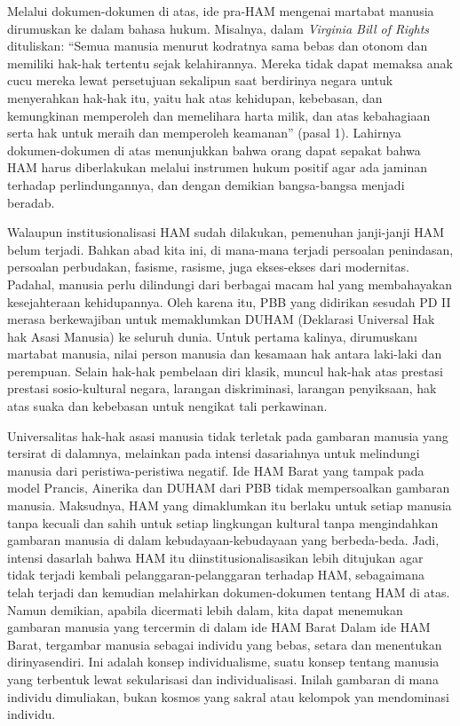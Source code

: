\documentclass[10pt,a4paper]{article}
\begin{document}
\begin{multicols}{2}
Melalui dokumen-dokumen di atas, ide pra-HAM mengenai martabat manusia
dirumuskan ke dalam bahasa hukum. Misalnya, dalam \emph{Virginia Bill of
Rights} dituliskan: ``Semua manusia menurut kodratnya sama bebas dan
otonom dan memiliki hak-hak tertentu sejak kelahirannya. Mereka tidak
dapat memaksa anak cucu mereka lewat persetujuan sekalipun saat
berdirinya negara untuk menyerahkan hak-hak itu, yaitu hak atas
kehidupan, kebebasan, dan kemungkinan memperoleh dan memelihara harta
milik, dan atas kebahagiaan serta hak untuk meraih dan memperoleh
keamanan'' (pasal 1). Lahirnya dokumen-dokumen di atas menunjukkan bahwa
orang dapat sepakat bahwa HAM harus diberlakukan melalui instrumen hukum
positif agar ada jaminan terhadap perlindungannya, dan dengan demikian
bangsa-bangsa menjadi beradab.

Walaupun institusionalisasi HAM sudah dilakukan, pemenuhan janji-janji
HAM belum terjadi. Bahkan abad kita ini, di mana-mana terjadi persoalan
penindasan, persoalan perbudakan, fasisme, rasisme, juga ekses-ekses
dari modernitas. Padahal, manusia perlu dilindungi dari berbagai macam
hal yang membahayakan kesejahteraan kehidupannya. Oleh karena itu, PBB
yang didirikan sesudah PD II merasa berkewajiban untuk memaklumkan DUHAM
(Deklarasi Universal Hak hak Asasi Manusia) ke seluruh dunia. Untuk
pertama kalinya, dirumuskanı martabat manusia, nilai person manusia dan
kesamaan hak antara laki-laki dan perempuan. Selain hak-hak pembelaan
diri klasik, muncul hak-hak atas prestasi prestasi sosio-kultural
negara, larangan diskriminasi, larangan penyiksaan, hak atas suaka dan
kebebasan untuk nengikat tali perkawinan.

Universalitas hak-hak asasi manusia tidak terletak pada gambaran manusia
yang tersirat di dalamnya, melainkan pada intensi dasariahnya untuk
melindungi manusia dari peristiwa-peristiwa negatif. Ide HAM Barat yang
tampak pada model Prancis, Ainerika dan DUHAM dari PBB tidak
mempersoalkan gambaran manusia. Maksudnya, HAM yang dimaklumkan itu
berlaku untuk setiap manusia tanpa kecuali dan sahih untuk setiap
lingkungan kultural tanpa mengindahkan gambaran manusia di dalam
kebudayaan-kebudayaan yang berbeda-beda. Jadi, intensi dasarlah bahwa
HAM itu diinstitusionalisasikan lebih ditujukan agar tidak terjadi
kembali pelanggaran-pelanggaran terhadap HAM, sebagaimana telah terjadi
dan kemudian melahirkan dokumen-dokumen tentang HAM di atas. Namun
demikian, apabila dicermati lebih dalam, kita dapat menemukan gambaran
manusia yang tercermin di dalam ide HAM Barat Dalam ide HAM Barat,
tergambar manusia sebagai individu yang bebas, setara dan menentukan
dirinyasendiri. Ini adalah konsep individualisme, suatu konsep tentang
manusia yang terbentuk lewat sekularisasi dan individualisasi. Inilah
gambaran di mana individu dimuliakan, bukan kosmos yang sakral atau
kelompok yan mendominasi individu.


\end{multicols}
\end{document}
